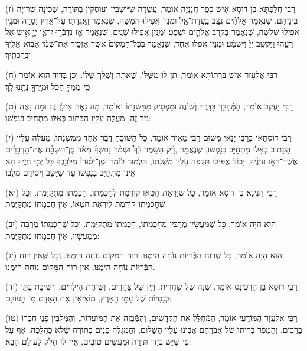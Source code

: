 \documentclass[twoside, openany, parskip=half, 11pt]{book}
\begin{document}
(ז)
רַבִּי חֲלַפְתָּא בֶּן דּוֹסָא אִישׁ כְּפַר חֲנַנְיָה אוֹמֵר, עֲשָׂרָה שֶׁיּוֹשְֿׁבִין וְעוֹסְֿקִין בַּתּוֹרָה, שְׁכִינָה שְׁרוּיָה בֵּינֵיהֶם, שֶׁנֶּאֱמַר אֱלֹהִ֗ים נִצָּ֥ב בַּֽעֲדַת־אֵ֑ל וּמִנַּיִן אֲפִילוּ חֲמִשָּׁה, שֶׁנֶּאֱמַר וַֽאֲגֻדָּת֖וֹ עַל־אֶ֣רֶץ יְסָדָ֑הּ וּמִנַּֽיִן אֲפִילוּ שְׁלֹשָׁה, שֶׁנֶּאֱמַר בְּקֶ֖רֶב אֱלֹהִ֣ים יִשְׁפֹּֽט׃ וּמִנַּֽיִן אֲפִילוּ שְׁנַֽיִם, שֶׁנֶּאֱמַר אָ֧ז נִדְבְּֿר֛וּ יִרְאֵ֥י יְיָ֖ אִ֣ישׁ אֶל רֵעֵ֑הוּ וַיַּקְשֵׁ֤ב יְיָ֙ וַיִּשְׁמָ֔ע׃
וּמִנַּיִן אֲפִלּוּ אֶחָד, שֶׁנֶּאֱמַר בְּכָל־הַמָּקוֹם֙ אֲשֶׁ֣ר אַזְכִּ֣יר אֶת־שְׁמִ֔י אָב֥וֹא אֵלֶ֖יךָ וּבֵֽרַכְתִּֽיךָ׃


(ח)
רַבִּי אֶלְעָזָר אִישׁ בַּרְתּוֹתָא אוֹמֵר, תֵּן לוֹ מִשֶּׁלּוֹ, שֶׁאַתָּה וְשֶׁלְּךָ שֶׁלּוֹ.
וְכֵן בְּדָוִד הוּא אוֹמֵר כִּֽי־מִמְּךָ֣ הַכֹּ֔ל וּמִיָּֽדְךָ֖ נָתַ֥נּוּ לָֽךְ׃

(ט) 
רַבִּי יַעֲקֹב אוֹמֵר, הַמְּֿהַלֵּךְ בַּדֶּרֶךְ וְשׁוֹנֶה וּמַפְסִיק מִמִּשְּׁנָתוֹ וְאוֹמֵר, מַה נָאֶה אִילָן זֶה וּמַה נָאֶה נִיר זֶה, מַעֲלֶה עָלָיו הַכָּתוּב כְּאִלּוּ מִתְחַיֵּב בְּנַפְשׁוֹ:

(י)
רַבִּי דּוֹסְתַאי בְּרַבִּי יַנַּאי מִשּׁוּם רַבִּי מֵאִיר אוֹמֵר, כָּל הַשּׁוֹכֵחַ דָּבָר אֶחָד מִמִּשְּׁנָתוֹ, מַעֲלֶה עָלָיו הַכָּתוּב כְּאִלּוּ מִתְחַיֵּב בְּנַפְשׁוֹ, שֶׁנֶּאֱמַר ,רַ֡ק הִשָּׁ֣מֶר לְךָ֩ וּשְׁמֹ֨ר נַפְשְֿׁךָ֜ מְאֹ֗ד פֶּן־תִּשְׁכַּ֨ח אֶת־הַדְּֿבָרִ֜ים אֲשֶׁר־רָא֣וּ עֵינֶ֗יךָ, יָכוֹל אֲפִילוּ תָּקְפָה עָלָיו מִשְׁנָתוֹ, תַּלְמוּד לוֹמַר וּפֶן־יָס֨וּרוּ֙ מִלְּבָ֣בְךָ֔ כֹּ֖ל יְמֵ֣י חַיֶּ֑יךָ הָא אֵינוֹ מִתְחַיַּב בְּנַפְשׁוֹ עַד שֶׁיֵּשֵׁב וִיסִירֵם מִלִּבּוֹ׃ 

(יא)
רַבִּי חֲנִינָא בֶּן דּוֹסָא אוֹמֵר, כָּל שֶׁיִּרְאַת חֶטְאוֹ קוֹדֶמֶת לְחָכְמָתוֹ, חָכְמָתוֹ מִתְקַיֶּמֶת.
וְכָל שֶׁחָכְמָתוֹ קוֹדֶמֶת לְיִרְאַת חֶטְאוֹ, אֵין חָכְמָתוֹ מִתְקַיֶּמֶת.

(יב)
הוּא הָיָה אוֹמֵר, כָּל שֶׁמַּעֲשָׂיו מְרֻבִּין מֵחָכְמָתוֹ, חָכְמָתוֹ מִתְקַיֶּמֶת.
וְכָל שֶׁחָכְמָתוֹ מְרֻבָּה מִמַּעֲשָׂיו, אֵין חָכְמָתוֹ מִתְקַיֶּמֶת:

(יג)
הוּא הָיָה אוֹמֵר, כָּל שֶׁרוּחַ הַבְּֿרִיּוֹת נוֹחָה הֵימֶנּוּ, רוּחַ הַמָּקוֹם נוֹחָה הֵימֶנּוּ.
וְכָל שֶּׁאֵין רוּחַ הַבְּֿרִיּוֹת נוֹחָה הֵימֶנּוּ, אֵין רוּחַ הַמָּקוֹם נוֹחָה הֵימֶנּוּ.

(יד)
רַבִּי דּוֹסָא בֶּן הַרְכִּינָס אוֹמֵר, שֵׁנָה שֶׁל שַׁחֲרִית, וְיַיִן שֶׁל צָהֳרַיִם, וְשִׂיחַת הַיְלָדִים, וִישִׁיבַת בָּתֵּי כְנֵסִיּוֹת שֶׁל עַמֵּי הָאָרֶץ, מוֹצִיאִין אֶת הָאָדָם מִן הָעוֹלָם:

(טו)
רַבִּי אֶלְעָזָר הַמּוֹדָעִי אוֹמֵר, הַמְּֿחַלֵּל אֶת הַקֳּדָשִׁים, וְהַמְּֿבַזֶּה אֶת הַמּוֹעֲדוֹת, וְהַמַּלְבִּין פְּנֵי חֲבֵרוֹ בָּרַבִּים, וְהַמֵּפֵר בְּרִיתוֹ שֶׁל אַבְרָהָם אָבִינוּ עָלָיו הַשָּׁלוֹם, וְהַמְּֿגַלֶּה פָנִים בַּתּוֹרָה שֶׁלֹּא כַּהֲלָכָה, אַף עַל פִּי שֶׁיֵּשׁ בְּיָדוֹ תּוֹרָה וּמַעֲשִׂים טוֹבִים, אֵין לוֹ חֵלֶק לָעוֹלָם הַבָּא:
\end{document}
